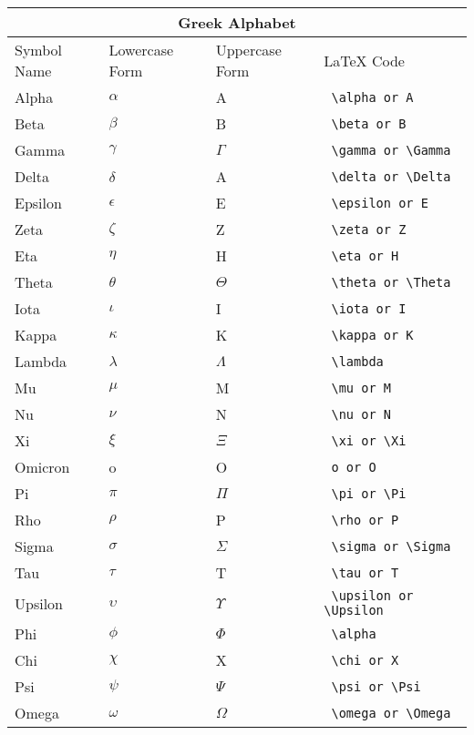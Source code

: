 \documentclass[12pt]{article}
\begin{document}
\begin{tabular}{ |p{3cm}|p{2cm}|p{2cm}|p{5cm}|  }
    \hline
    \multicolumn{4}{|c|}{Greek Alphabet} \\
    \hline
    Symbol Name & Lowercase Form & Uppercase Form & LaTeX Code \\
    \hline
    Alpha & $\alpha$ & A & \verb= \alpha or A=\\
    Beta & $\beta$ & B & \verb= \beta or B=\\
    Gamma & $\gamma$ & $\Gamma$ & \verb= \gamma or \Gamma =\\
    Delta & $\delta$ & A & \verb= \delta or \Delta =\\
    Epsilon & $\epsilon$ & E & \verb= \epsilon or E =\\
    Zeta & $\zeta$ & Z & \verb= \zeta or Z=\\
    Eta & $\eta$ & H & \verb= \eta or H=\\
    Theta & $\theta$ & $\Theta$ & \verb= \theta or \Theta=\\
    Iota & $\iota$ & I & \verb= \iota or I=\\
    Kappa & $\kappa$ & K & \verb= \kappa or K =\\
    Lambda & $\lambda$ & $\Lambda$ & \verb= \lambda =\\
    Mu & $\mu$ & M & \verb= \mu or M =\\
    Nu & $\nu$ & N & \verb= \nu or N=\\
    Xi & $\xi$ & $\Xi$ & \verb= \xi or \Xi =\\
    Omicron & o & O & \verb= o or O =\\
    Pi & $\pi$ & $\Pi$ & \verb= \pi or \Pi=\\
    Rho & $\rho$ & P & \verb= \rho or P =\\
    Sigma & $\sigma$ & $\Sigma$ & \verb= \sigma or \Sigma =\\
    Tau & $\tau$ & T & \verb= \tau or T =\\
    Upsilon & $\upsilon$ & $\Upsilon$ & \verb= \upsilon or \Upsilon =\\
    Phi & $\phi$ & $\Phi$ & \verb= \alpha =\\
    Chi & $\chi$ & X & \verb= \chi or X =\\
    Psi & $\psi$ & $\Psi$ & \verb= \psi or \Psi =\\
    Omega & $\omega$ & $\Omega$ & \verb= \omega or \Omega =\\
    \hline
\end{tabular}
\\
\\
\\
\end{document}
